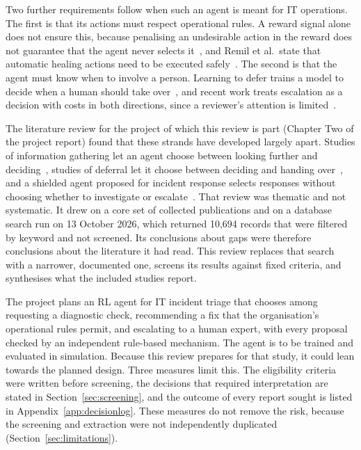 Two further requirements follow when such an agent is meant for IT operations. The first is that its actions must respect operational rules. A reward signal alone does not ensure this, because penalising an undesirable action in the reward does not guarantee that the agent never selects it~\cite{konighofer2025}, and Remil et al.\ state that automatic healing actions need to be executed safely~\cite{remil2024}. The second is that the agent must know when to involve a person. Learning to defer trains a model to decide when a human should take over~\cite{madras2018}, and recent work treats escalation as a decision with costs in both directions, since a reviewer's attention is limited~\cite{turan2026}.

The literature review for the project of which this review is part (Chapter Two of the project report) found that these strands have developed largely apart. Studies of information gathering let an agent choose between looking further and deciding~\cite{janisch2019,kim2025}, studies of deferral let it choose between deciding and handing over~\cite{madras2018,joshi2023}, and a shielded agent proposed for incident response selects responses without choosing whether to investigate or escalate~\cite{alauthman2026}. That review was thematic and not systematic. It drew on a core set of collected publications and on a database search run on 13 October 2026, which returned 10,694 records that were filtered by keyword and not screened. Its conclusions about gaps were therefore conclusions about the literature it had read. This review replaces that search with a narrower, documented one, screens its results against fixed criteria, and synthesises what the included studies report.

The project plans an RL agent for IT incident triage that chooses among requesting a diagnostic check, recommending a fix that the organisation's operational rules permit, and escalating to a human expert, with every proposal checked by an independent rule-based mechanism. The agent is to be trained and evaluated in simulation. Because this review prepares for that study, it could lean towards the planned design. Three measures limit this. The eligibility criteria were written before screening, the decisions that required interpretation are stated in Section~\ref{sec:screening}, and the outcome of every report sought is listed in Appendix~\ref{app:decisionlog}. These measures do not remove the risk, because the screening and extraction were not independently duplicated (Section~\ref{sec:limitations}).

